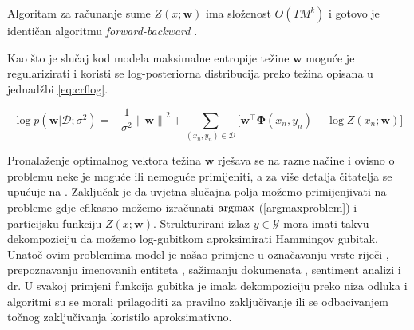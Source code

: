 Algoritam za računanje sume $Z(x; \mathbf{w})$ ima složenost $O(T M ^ k)$ i
gotovo je identičan algoritmu \textit{forward-backward}
\citep{baum1966statistical}.

Kao što je slučaj kod modela maksimalne entropije težine $\mathbf{w}$ moguće je
regularizirati i koristi se log-posteriorna distribucija preko težina opisana u
jednadžbi \ref{eq:crflog}.

\begin{equation}\label{eq:crflog}
  \log p(\mathbf{w} | \mathcal{D}; \sigma^2) = -\frac{1}{\sigma^2} {\lVert\mathbf{w}\lVert}^2 + \sum_{(x_n, y_n) \in \mathcal{D}} \bigg[ \mathbf{w}^\top \mathbf{\Phi}(x_n, y_n) - \log Z(x_n; \mathbf{w}) \bigg]
\end{equation}

Pronalaženje optimalnog vektora težina $\mathbf{w}$ rješava se na razne načine
\citep{lafferty2001conditional, sha2003shallow, sokolovska2010efficient} i
ovisno o problemu neke je moguće ili nemoguće primijeniti, a za više detalja
čitatelja se upućuje na \citep{wallach2004conditional, sutton2006introduction}.
Zaključak je da uvjetna slučajna polja možemo primijenjivati na probleme gdje
efikasno možemo izračunati $\operatorname*{argmax}$ (\ref{argmaxproblem}) i particijsku
funkciju $Z(x; \mathbf{w})$. Strukturirani izlaz $y \in \mathcal{Y}$ mora imati
takvu dekompoziciju da možemo log-gubitkom aproksimirati Hammingov gubitak.
Unatoč ovim problemima model je našao primjene u označavanju vrste riječi
\citep{lafferty2001conditional}, prepoznavanju imenovanih entiteta
\citep{mccallum2003early, settles2004biomedical}, sažimanju dokumenata
 \citep{shen2007document}, sentiment analizi
\citep{mcdonald2007structured} i dr. U svakoj primjeni funkcija gubitka je imala
dekompoziciju preko niza odluka i algoritmi su se morali prilagoditi za pravilno
zaključivanje ili se odbacivanjem točnog zaključivanja koristilo aproksimativno.
